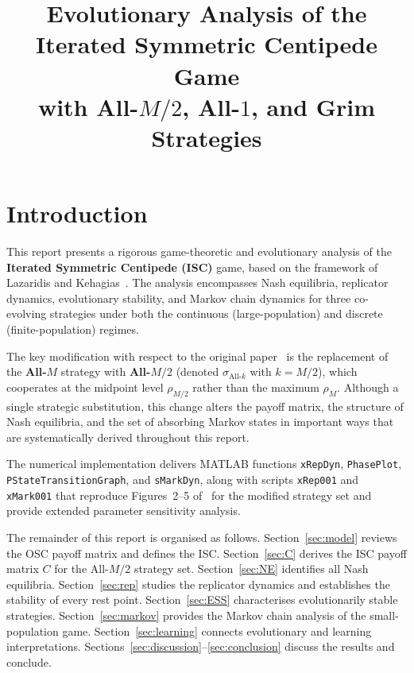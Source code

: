 \documentclass[12pt,a4paper]{article}
\title{\textbf{Evolutionary Analysis of the Iterated Symmetric Centipede Game}\\[0.5em]
\large with All-$M/2$, All-$1$, and Grim Strategies}
\author{}
\date{}
\begin{document}
\maketitle
\tableofcontents
\newpage

\section{Introduction}

This report presents a rigorous game-theoretic and evolutionary analysis of the
\textbf{Iterated Symmetric Centipede (ISC)} game, based on the framework of
Lazaridis and Kehagias~\cite{LK2026}. The analysis encompasses Nash equilibria,
replicator dynamics, evolutionary stability, and Markov chain dynamics for three
co-evolving strategies under both the continuous (large-population) and discrete
(finite-population) regimes.

The key modification with respect to the original paper~\cite{LK2026} is the
replacement of the \textbf{All-$M$} strategy with \textbf{All-$M/2$} (denoted
$\sigma_{\text{All-}k}$ with $k = M/2$), which cooperates at the midpoint
level $\rho_{M/2}$ rather than the maximum $\rho_M$. Although a single strategic
substitution, this change alters the payoff matrix, the structure of Nash
equilibria, and the set of absorbing Markov states in important ways that are
systematically derived throughout this report.

The numerical implementation delivers MATLAB functions \texttt{xRepDyn},
\texttt{PhasePlot}, \texttt{PStateTransitionGraph}, and \texttt{sMarkDyn}, along
with scripts \texttt{xRep001} and \texttt{xMark001} that reproduce Figures~2--5
of~\cite{LK2026} for the modified strategy set and provide extended parameter
sensitivity analysis.

The remainder of this report is organised as follows. Section~\ref{sec:model}
reviews the OSC payoff matrix and defines the ISC. Section~\ref{sec:C} derives
the ISC payoff matrix $C$ for the All-$M/2$ strategy set.
Section~\ref{sec:NE} identifies all Nash equilibria. Section~\ref{sec:rep}
studies the replicator dynamics and establishes the stability of every rest
point. Section~\ref{sec:ESS} characterises evolutionarily stable strategies.
Section~\ref{sec:markov} provides the Markov chain analysis of the
small-population game. Section~\ref{sec:learning} connects evolutionary and
learning interpretations. Sections~\ref{sec:discussion}--\ref{sec:conclusion}
discuss the results and conclude.
\end{document}
